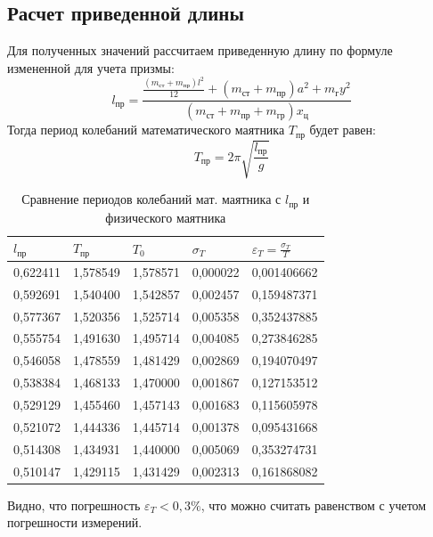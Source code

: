 \documentclass[a4paper]{article}
\begin{document}
\subsection{Расчет приведенной длины}
Для полученных значений рассчитаем приведенную длину по формуле измененной для учета призмы:
\[l_{\text{пр}} = \frac{\frac{(m_{\text{ст}} + m_{\text{пр}})l^2}{12} + (m_{\text{ст}} + m_{\text{пр}})a^2 + m_{\text{г}}y^2}{(m_{\text{ст}} + m_{\text{пр}} + m_{\text{гр}}) x_{\text{ц}}} \]
Тогда период колебаний математического маятника $T_{\text{пр}}$ будет равен:
\[T_{\text{пр}} = 2\pi \sqrt{\frac{l_{\text{пр}}}{g}}\]
\begin{table}[!h]
\begin{center}
\begin{tabular}{|l|l|l|l|l|}
\hline
$l_{\text{пр}}$ & $T_{\text{пр}}$ & $T_{0}$  & $\sigma_{T}$ & $\varepsilon_{T} = \frac{\sigma_{T}}{T}$   \\ \hline
0,622411        & 1,578549        & 1,578571 & 0,000022     & 0,001406662                                \\ \hline
0,592691        & 1,540400        & 1,542857 & 0,002457     & 0,159487371                                \\ \hline
0,577367        & 1,520356        & 1,525714 & 0,005358     & 0,352437885                                \\ \hline
0,555754        & 1,491630        & 1,495714 & 0,004085     & 0,273846285                                \\ \hline
0,546058        & 1,478559        & 1,481429 & 0,002869     & 0,194070497                                \\ \hline
0,538384        & 1,468133        & 1,470000 & 0,001867     & 0,127153512                                \\ \hline
0,529129        & 1,455460        & 1,457143 & 0,001683     & 0,115605978                                \\ \hline
0,521072        & 1,444336        & 1,445714 & 0,001378     & 0,095431668                                \\ \hline
0,514308        & 1,434931        & 1,440000 & 0,005069     & 0,353274731                                \\ \hline
0,510147        & 1,429115        & 1,431429 & 0,002313     & 0,161868082                                \\ \hline
\end{tabular}
\caption{Сравнение периодов колебаний мат. маятника с $l_{\text{пр}}$ и физического маятника}
\end{center}
\end{table}
Видно, что погрешность $\varepsilon_{T} < 0,3\%$, что можно считать равенством с учетом погрешности измерений.
\end{document}
